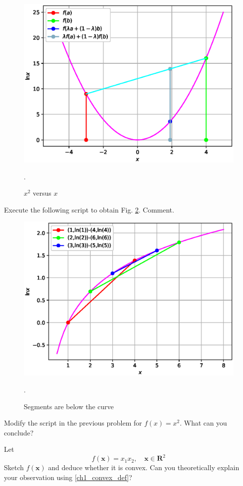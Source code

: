 \begin{figure}[h]
\centering
\includegraphics[width=\columnwidth]{./chapter1/figs/1.2.eps}
\caption{ $x^2$ versus $x$}.
\label{fig.1.2}	
\end{figure}
%
\begin{problem}
Execute the following script to obtain Fig. \ref{fig.1.3}. Comment.
\end{problem}
%

%
\begin{figure}[h]
\centering
\includegraphics[width=\columnwidth]{./chapter1/figs/1.3.eps}
\caption{ Segments are below the curve}.
\label{fig.1.3}	
\end{figure}
%
\begin{problem}
Modify the script in the previous problem for $f(x) = x^2$.  What can you conclude?
\end{problem}
\begin{problem}
Let 
\begin{equation}
f(\mathbf{x}) = x_1x_2, \quad \mathbf{x} \in \mathbf{R}^2
\end{equation}
Sketch $f(\mathbf{x})$ and deduce whether it is convex.
Can you theoretically explain your observation using \eqref{ch1_convex_def}?
\end{problem}
%

